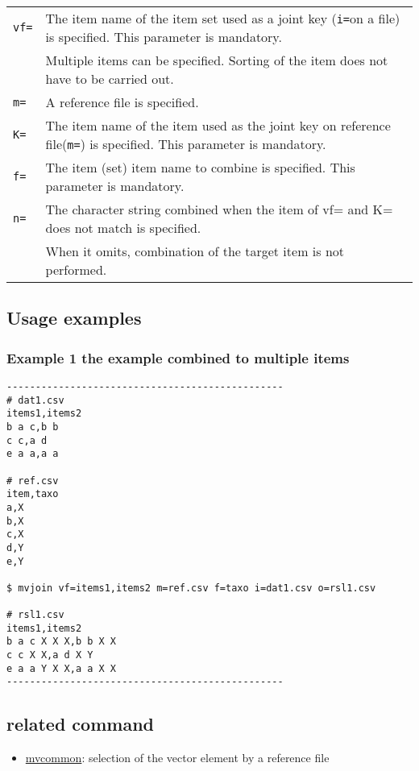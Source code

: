 \documentclass[a4paper]{jarticle}
\begin{document}
\begin{table}[htbp]
{\small
\begin{tabular}{ll}
\verb|vf=| & The item name of the item set used as a joint key (\verb|i=|on a file) is specified. 
This parameter is mandatory.\\
           & Multiple items can be specified. Sorting of the item does not have to be carried out.  \\
\verb|m=|  & A reference file is specified. \\
\verb|K=|  & The item name of the item used as the joint key on reference file(\verb|m=|) is specified. 
This parameter is mandatory.\\
\verb|f=|  & The item (set) item name to combine is specified. 
This parameter is mandatory.\\
\verb|n=|  & The character string combined when the item of vf= and K= does not match is specified.  \\
           & When it omits, combination of the target item is not performed. 
 \\
\end{tabular}
}
\end{table} 

\subsection*{Usage examples}
\subsubsection*{Example 1 the example combined to multiple items}
\begin{verbatim}
------------------------------------------------
# dat1.csv
items1,items2
b a c,b b
c c,a d
e a a,a a

# ref.csv
item,taxo
a,X
b,X
c,X
d,Y
e,Y

$ mvjoin vf=items1,items2 m=ref.csv f=taxo i=dat1.csv o=rsl1.csv

# rsl1.csv
items1,items2
b a c X X X,b b X X
c c X X,a d X Y
e a a Y X X,a a X X
------------------------------------------------
\end{verbatim}

\subsection*{related command}
\begin{itemize}
\item \href{run:mvcommon.pdf}{mvcommon}: selection of the vector element by a reference file 

\end{itemize}
\end{document}
